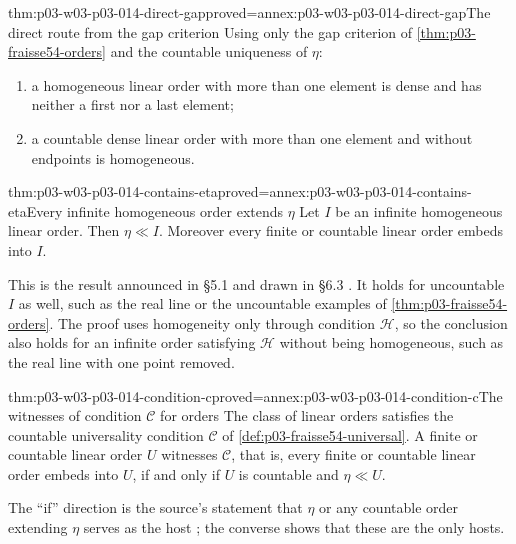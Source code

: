 \begin{hbtheorem}{thm:p03-w03-p03-014-direct-gap}{proved=annex:p03-w03-p03-014-direct-gap}{The direct route from the gap criterion}
Using only the gap criterion of \cref{thm:p03-fraisse54-orders} and the
countable uniqueness of \(\eta\):
\begin{enumerate}
\item a homogeneous linear order with more than one element is dense and
      has neither a first nor a last element;
\item a countable dense linear order with more than one element and
      without endpoints is homogeneous.
\end{enumerate}
\end{hbtheorem}

\begin{hbtheorem}{thm:p03-w03-p03-014-contains-eta}{proved=annex:p03-w03-p03-014-contains-eta}{Every infinite homogeneous order extends \(\eta\)}
Let \(I\) be an infinite homogeneous linear order. Then
\(\eta\ll I\). Moreover every finite or countable linear order embeds
into \(I\).
\end{hbtheorem}

This is the result announced in \S5.1 and drawn in \S6.3
\cite[\S5.1, p.~377; \S6.3, p.~380]{Fraisse1954}. It holds for
uncountable \(I\) as well, such as the real line or the uncountable
examples of \cref{thm:p03-fraisse54-orders}. The proof uses homogeneity
only through condition \(\mathcal H\), so the conclusion also holds for
an infinite order satisfying \(\mathcal H\) without being homogeneous,
such as the real line with one point removed.

\begin{hbtheorem}{thm:p03-w03-p03-014-condition-c}{proved=annex:p03-w03-p03-014-condition-c}{The witnesses of condition \(\mathcal C\) for orders}
The class of linear orders satisfies the countable universality condition
\(\mathcal C\) of \cref{def:p03-fraisse54-universal}. A finite or
countable linear order \(U\) witnesses \(\mathcal C\), that is, every
finite or countable linear order embeds into \(U\), if and only if
\(U\) is countable and \(\eta\ll U\).
\end{hbtheorem}

The ``if'' direction is the source's statement that \(\eta\) or any
countable order extending \(\eta\) serves as the host
\cite[\S4.7, p.~376]{Fraisse1954}; the converse shows that these are the
only hosts.

